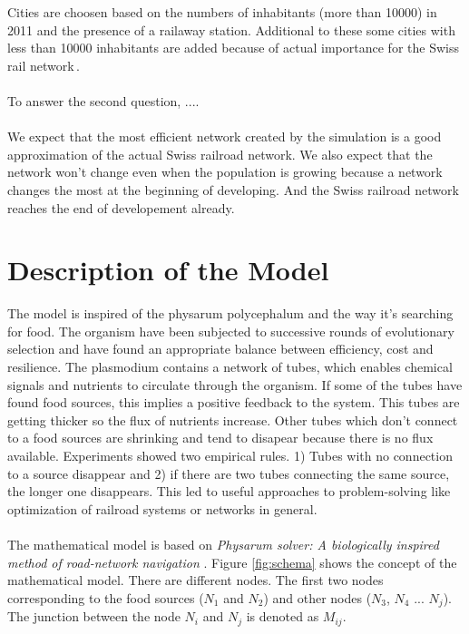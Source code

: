 \documentclass[11pt]{scrartcl}
\begin{document}
Cities are choosen based on the numbers of inhabitants (more than 10000) in 2011 and the presence of a railaway station. Additional to these some cities with less than 10000 inhabitants are added because of actual importance for the Swiss rail network\,\cite{bfs}. ~\\
~\\
To answer the second question, ....~\\
~\\
We expect that the most efficient network created by the simulation is a good approximation of the actual Swiss railroad network. We also expect that the network won't change even when the population is growing because a network changes the most at the beginning of developing. And the Swiss railroad network reaches the end of developement already.




\section{Description of the Model}

The model is inspired of the physarum polycephalum and the way it's searching for food. The organism have been subjected to successive rounds of evolutionary selection and have found an appropriate balance between efficiency, cost and resilience. The plasmodium contains a network of tubes, which enables chemical signals and nutrients to circulate through the organism. If some of the tubes have found food sources, this implies a positive feedback to the system. This tubes are getting thicker so the flux of nutrients increase. Other tubes which don't connect to a food sources are shrinking and tend to disapear because there is no flux available. Experiments showed two empirical rules. 1) Tubes with no connection to a source disappear and 2) if there are two tubes connecting the same source, the longer one disappears. This led to useful approaches to problem-solving like optimization of railroad systems or networks in general.~\\
~\\
The mathematical model is based on \textit{Physarum solver: A biologically inspired method of road-network navigation} \cite{network_model}. Figure \ref{fig:schema} shows the concept of the mathematical model. There are different nodes. The first two nodes corresponding to the food sources ($N_1$ and $N_2$) and other nodes ($N_3$, $N_4$ ... $N_j$). The junction between the node $N_i$ and $N_j$ is denoted as $M_{ij}$.
\end{document}
